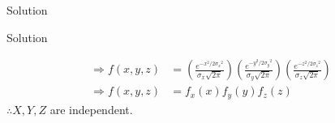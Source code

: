 \documentclass{beamer}
\providecommand{\brak}[1]{\ensuremath{\left(#1\right)}}
\begin{document}
\begin{frame}{Solution}
\begin{block}{Solution}


\begin{align}
\Rightarrow f(x,y,z) &= \brak{\frac{e^{-x^{2}/2{\sigma_x}^{2}}}{\sigma_x\sqrt{2\pi}}} \brak{\frac{e^{-y^{2}/2{\sigma_y}^{2}}}{\sigma_y\sqrt{2\pi}}} \brak{\frac{e^{-z^{2}/2{\sigma_z}^{2}}}{\sigma_z\sqrt{2\pi}}} \\
\Rightarrow f(x,y,z) &= f_x(x) f_y(y) f_z(z)
\end{align}
 $\therefore X,Y,Z$ are independent.
\end{block}
    
\end{frame}
\end{document}
